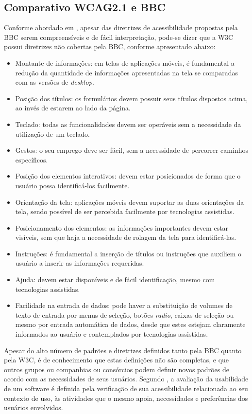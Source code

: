 \subsection{Comparativo WCAG2.1 e BBC}
Conforme abordado em \cite{camilamaster}, apesar das diretrizes de acessibilidade propostas pela BBC serem compreensíveis e de fácil interpretação, pode-se dizer que a W3C possui diretrizes não cobertas pela BBC, conforme apresentado abaixo:
\begin{itemize}
	\item Montante de informações: em telas de aplicações móveis, é fundamental a redução da quantidade de informações apresentadas na tela se comparadas com as versões de \textit{desktop}.
	\item Posição dos títulos: os formulários devem possuir seus títulos dispostos acima, ao invés de estarem ao lado da página.
	\item Teclado: todas as funcionalidades devem ser operáveis sem a necessidade da utilização de um teclado.
	\item Gestos: o seu emprego deve ser fácil, sem a necessidade de percorrer caminhos específicos.
	\item Posição dos elementos interativos: devem estar posicionados de forma que o usuário possa identificá-los facilmente.
	\item Orientação da tela: aplicações móveis devem suportar as duas orientações da tela, sendo possível de ser percebida facilmente por tecnologias assistidas.
	\item Posicionamento dos elementos: as informações importantes devem estar visíveis, sem que haja a necessidade de rolagem da tela para identificá-las.
	\item Instruções: é fundamental a inserção de títulos ou instruções que auxiliem o usuário a inserir as informações requeridas.
	\item Ajuda: devem estar disponíveis e de fácil identificação, mesmo com tecnologias assistidas.
	\item Facilidade na entrada de dados: pode haver a substituição de volumes de texto de entrada por menus de seleção, botões \textit{radio}, caixas de seleção ou mesmo por entrada automática de dados, desde que estes estejam claramente informados ao usuário e contemplados por tecnologias assistidas.
\end{itemize}

Apesar do alto número de padrões e diretrizes definidos tanto pela BBC quanto pela W3C, é de conhecimento que estas definições não são completas, e que outros grupos ou companhias ou consórcios podem definir novos padrões de acordo com as necessidades de seus usuários. Segundo \cite{meloihc2004}, a avaliação da usabilidade de um software é definida pela verificação de sua acessibilidade relacionada ao seu contexto de uso, às atividades que o mesmo apoia, necessidades e preferências dos usuários envolvidos.  



